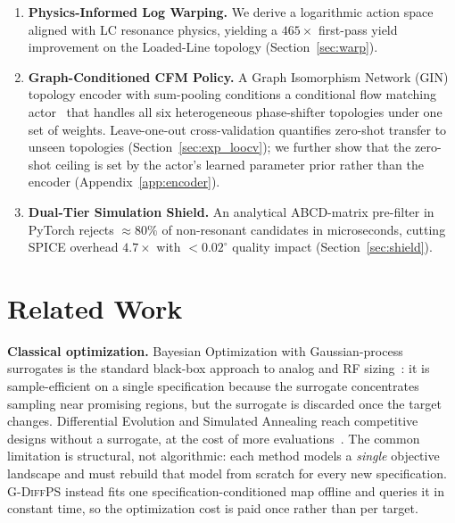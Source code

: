\documentclass[sigconf,anonymous,review]{acmart}
\newcommand{\gdiffps}{\textsc{G-DiffPS}}
\begin{document}
\begin{enumerate}
  \item \textbf{Physics-Informed Log Warping.}  We derive a logarithmic action
    space aligned with LC resonance physics, yielding a $465{\times}$
    first-pass yield improvement on the Loaded-Line topology
    (Section~\ref{sec:warp}).

  \item \textbf{Graph-Conditioned CFM Policy.}  A Graph Isomorphism Network
    (GIN) topology encoder with sum-pooling conditions a conditional flow
    matching actor~\cite{lipman2023flow} that handles all six heterogeneous
    phase-shifter topologies under one set of weights.  Leave-one-out
    cross-validation quantifies zero-shot transfer to unseen topologies
    (Section~\ref{sec:exp_loocv}); we further show that the zero-shot
    ceiling is set by the actor's learned parameter prior rather than the
    encoder (Appendix~\ref{app:encoder}).

  \item \textbf{Dual-Tier Simulation Shield.}  An analytical ABCD-matrix
    pre-filter in PyTorch rejects ${\approx}80\%$ of non-resonant candidates
    in microseconds, cutting SPICE overhead $4.7{\times}$ with $<0.02^\circ$
    quality impact (Section~\ref{sec:shield}).
\end{enumerate}

\section{Related Work}
\label{sec:related}

\textbf{Classical optimization.}
Bayesian Optimization with Gaussian-process surrogates is the standard
black-box approach to analog and RF sizing~\cite{hakhamaneshi2022}: it is
sample-efficient on a single specification because the surrogate concentrates
sampling near promising regions, but the surrogate is discarded once the target
changes.  Differential Evolution and Simulated Annealing reach competitive
designs without a surrogate, at the cost of more
evaluations~\cite{storn1997}.  The common limitation is structural, not
algorithmic: each method models a \emph{single} objective landscape and must
rebuild that model from scratch for every new specification.  \gdiffps{} instead
fits one specification-conditioned map offline and queries it in constant time,
so the optimization cost is paid once rather than per target.
\end{document}
